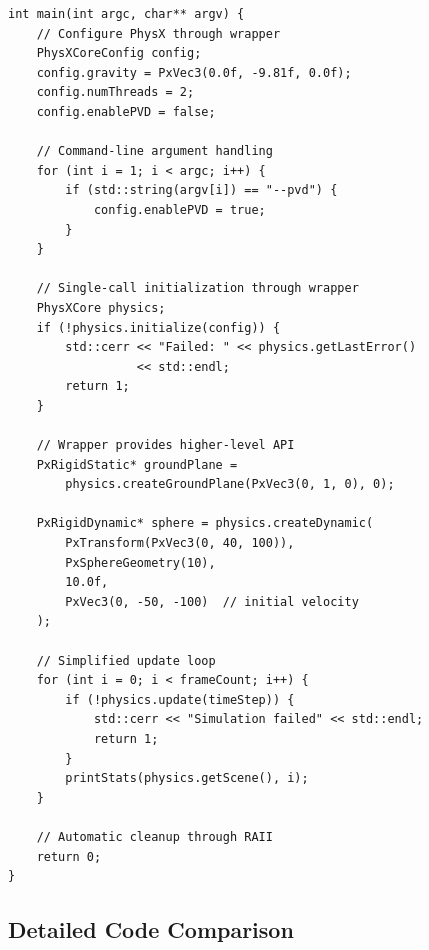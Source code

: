 \begin{lstlisting}[caption={Ported: PhysXCore wrapper initialization}]
int main(int argc, char** argv) {
    // Configure PhysX through wrapper
    PhysXCoreConfig config;
    config.gravity = PxVec3(0.0f, -9.81f, 0.0f);
    config.numThreads = 2;
    config.enablePVD = false;

    // Command-line argument handling
    for (int i = 1; i < argc; i++) {
        if (std::string(argv[i]) == "--pvd") {
            config.enablePVD = true;
        }
    }

    // Single-call initialization through wrapper
    PhysXCore physics;
    if (!physics.initialize(config)) {
        std::cerr << "Failed: " << physics.getLastError()
                  << std::endl;
        return 1;
    }

    // Wrapper provides higher-level API
    PxRigidStatic* groundPlane =
        physics.createGroundPlane(PxVec3(0, 1, 0), 0);

    PxRigidDynamic* sphere = physics.createDynamic(
        PxTransform(PxVec3(0, 40, 100)),
        PxSphereGeometry(10),
        10.0f,
        PxVec3(0, -50, -100)  // initial velocity
    );

    // Simplified update loop
    for (int i = 0; i < frameCount; i++) {
        if (!physics.update(timeStep)) {
            std::cerr << "Simulation failed" << std::endl;
            return 1;
        }
        printStats(physics.getScene(), i);
    }

    // Automatic cleanup through RAII
    return 0;
}
\end{lstlisting}

\subsection{Detailed Code Comparison}

